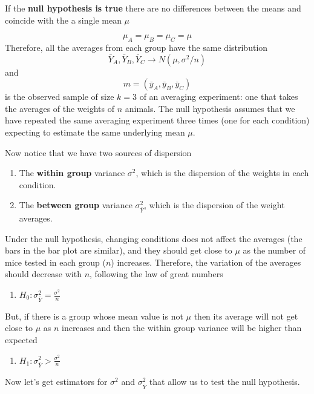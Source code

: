 \documentclass[
]{book}
\providecommand{\tightlist}{%
  \setlength{\itemsep}{0pt}\setlength{\parskip}{0pt}}
\begin{document}
If the \textbf{null hypothesis is true} there are no differences between the means and coincide with the a single mean \(\mu\)

\[\mu_A=\mu_B=\mu_C=\mu\]
Therefore, all the averages from each group have the same distribution \[\bar{Y}_A, \bar{Y}_B, \bar{Y}_C \rightarrow N(\mu, \sigma^2/n)\] and
\[m=(\bar{y}_A, \bar{y}_B, \bar{y}_C )\] is the observed sample of size \(k=3\) of an averaging experiment: one that takes the averages of the weights of \(n\) animals. The null hypothesis assumes that we have repeated the same averaging experiment three times (one for each condition) expecting to estimate the same underlying mean \(\mu\).

Now notice that we have two sources of dispersion

\begin{enumerate}
\def\labelenumi{\arabic{enumi}.}
\item
  The \textbf{within group} variance \(\sigma^2\), which is the dispersion of the weights in each condition.
\item
  The \textbf{between group} variance \(\sigma^2_{\bar{Y}}\), which is the dispersion of the weight averages.
\end{enumerate}

Under the null hypothesis, changing conditions does not affect the averages (the bars in the bar plot are similar), and they should get close to \(\mu\) as the number of mice tested in each group (\(n\)) increases. Therefore, the variation of the averages should decrease with \(n\), following the law of great numbers

\begin{enumerate}
\def\labelenumi{\alph{enumi}.}
\tightlist
\item
  \(H_0: \sigma^2_{\bar{Y}}=\frac{\sigma^2}{n}\)
\end{enumerate}

But, if there is a group whose mean value is not \(\mu\) then its average will not get close to \(\mu\) as \(n\) increases and then the within group variance will be higher than expected

\begin{enumerate}
\def\labelenumi{\alph{enumi}.}
\setcounter{enumi}{1}
\tightlist
\item
  \(H_1: \sigma^2_{\bar{Y}}>\frac{\sigma^2}{n}\)
\end{enumerate}

Now let's get estimators for \(\sigma^2\) and \(\sigma^2_{\bar{Y}}\) that allow us to test the null hypothesis.
\end{document}
